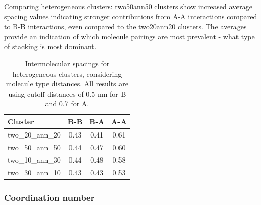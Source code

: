 Comparing heterogeneous clusters: two50ann50 clusters show increased average spacing values indicating stronger contributions from A-A interactions compared to B-B interactions, even compared to the two20ann20 clusters. %
The averages provide an indication of which molecule pairings are most prevalent - what type of stacking is most dominant. %

%
\begin{table}[hb]
\centering
\caption{Intermolecular spacings for heterogeneous clusters, considering molecule type distances. All results are using cutoff distances of 0.5 nm for B and 0.7 for A.}
\label{table:mixedintermolecdists}
\begin{tabular}{lccc}
\hline
Cluster & B-B & B-A & A-A \\ \hline
two\_20\_ann\_20 & 0.43 & 0.41 & 0.61 \\
two\_50\_ann\_50 & 0.44 & 0.47 & 0.60 \\
two\_10\_ann\_30 & 0.44 & 0.48 & 0.58 \\
two\_30\_ann\_10 & 0.43 & 0.43 & 0.53 \\ \hline
\end{tabular}
\end{table}
%

\subsubsection{Coordination number}

